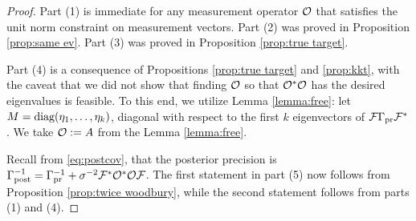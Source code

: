 \char*

\begin{proof}
  Part (1) is immediate for any measurement operator $\mathcal{O}$ that
  satisfies the unit norm constraint on measurement vectors. Part (2)
  was proved in Proposition \ref{prop:same ev}. Part (3) was proved in
  Proposition \ref{prop:true target}.
  
  Part (4) is a consequence of Propositions \ref{prop:true target} and
  \ref{prop:kkt}, with the caveat that we did not show that finding
  $\mathcal{O}$ so that $\mathcal{O}^*\mathcal{O}$ has the desired eigenvalues is
  feasible. To this end, we utilize Lemma \ref{lemma:free}: let $M =
  \textup{diag}(\eta_1, \dots, \eta_k)$, diagonal with respect to the first $k$
  eigenvectors of $\mathcal{F} \Gamma_{\textup{pr}} \mathcal{F}^*$. We take $\mathcal{O} := A$ from the
  Lemma \ref{lemma:free}.
  
  Recall from \eqref{eq:postcov}, that the posterior precision is
  $\Gamma_{\textup{post}}^{-1} = \Gamma_{\textup{pr}}^{-1} + \sigma^{-2}\mathcal{F}^*\mathcal{O}^*\mathcal{O}\mathcal{F}$. The
  first statement in part (5) now follows from Proposition
  \ref{prop:twice woodbury}, while the second statement follows from
  parts (1) and (4).
\end{proof}


\optimalvsnot

